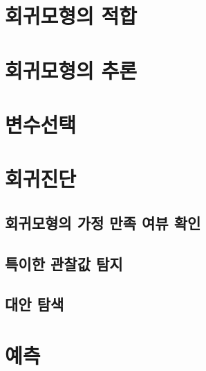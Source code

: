 \documentclass[
]{book}
\begin{document}
\hypertarget{uxd68cuxadc0uxbaa8uxd615uxc758-uxc801uxd569}{%
\section{회귀모형의 적합}\label{uxd68cuxadc0uxbaa8uxd615uxc758-uxc801uxd569}}

\hypertarget{uxd68cuxadc0uxbaa8uxd615uxc758-uxcd94uxb860}{%
\section{회귀모형의 추론}\label{uxd68cuxadc0uxbaa8uxd615uxc758-uxcd94uxb860}}

\hypertarget{uxbcc0uxc218uxc120uxd0dd}{%
\section{변수선택}\label{uxbcc0uxc218uxc120uxd0dd}}

\hypertarget{uxd68cuxadc0uxc9c4uxb2e8}{%
\section{회귀진단}\label{uxd68cuxadc0uxc9c4uxb2e8}}

\hypertarget{uxd68cuxadc0uxbaa8uxd615uxc758-uxac00uxc815-uxb9ccuxc871-uxc5ecuxbdf0-uxd655uxc778}{%
\subsection{회귀모형의 가정 만족 여뷰 확인}\label{uxd68cuxadc0uxbaa8uxd615uxc758-uxac00uxc815-uxb9ccuxc871-uxc5ecuxbdf0-uxd655uxc778}}

\hypertarget{uxd2b9uxc774uxd55c-uxad00uxcc30uxac12-uxd0d0uxc9c0}{%
\subsection{특이한 관찰값 탐지}\label{uxd2b9uxc774uxd55c-uxad00uxcc30uxac12-uxd0d0uxc9c0}}

\hypertarget{uxb300uxc548-uxd0d0uxc0c9}{%
\subsection{대안 탐색}\label{uxb300uxc548-uxd0d0uxc0c9}}

\hypertarget{uxc608uxce21}{%
\section{예측}\label{uxc608uxce21}}
\end{document}
